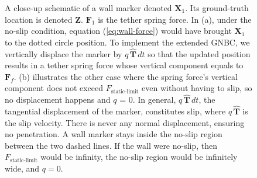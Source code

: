 \documentclass[%
 aip,
 amsmath,amssymb,
 reprint,
 floatfix
]{revtex4-1}
\begin{document}
\begin{figure}
    \centering
    \quad
    \caption{\footnotesize{A close-up schematic of a wall marker denoted $\bm{X}_1$. Its ground-truth location is denoted $\bm{Z}$. $\bm{F}_1$ is the tether spring force. In (a), under the no-slip condition, equation (\ref{eq:wall-force}) would have brought $\bm{X}_1$ to the dotted circle position. To implement the extended GNBC, we vertically displace the marker by $q \, \bm{\hat{T}} \, dt$ so that the updated position results in a tether spring force whose vertical component equals to $\bm{F}_f$. (b) illustrates the other case where the spring force's vertical component does not exceed $F_\text{static-limit}$ even without having to slip, so no displacement happens and $q$ = 0. In general, $q \, \bm{\hat{T}} \, dt$, the tangential displacement of the marker, constitutes slip, where $q \, \bm{\hat{T}}$ is the slip velocity. There is never any normal displacement, ensuring no penetration. A wall marker stays inside the no-slip region between the two dashed lines. If the wall were no-slip, then $F_\text{static-limit}$ would be infinity, the no-slip region would be infinitely wide, and $q = 0$. 
    }}
    \label{fig:displace}
\end{figure}
\end{document}

